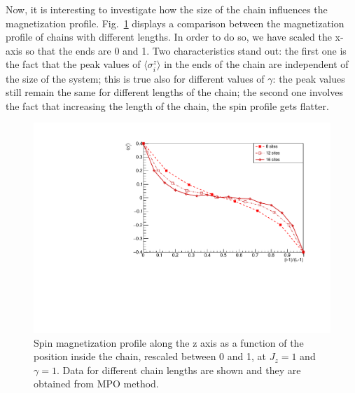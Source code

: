 
Now, it is interesting to investigate how the size of the chain influences the magnetization profile. Fig.~\ref{fig:LM_comparisonVSsizeJz1Gamma1} displays a comparison between the magnetization profile of chains with different lengths. In order to do so, we have scaled the x-axis so that the ends are 0 and 1. Two characteristics stand out: the first one is the fact that the peak values of $\langle\sigma_i^z\rangle$ in the ends of the chain are independent of the size of the system; this is true also for different values of $\gamma$: the peak values still remain the same for different lengths of the chain; the second one involves the fact that increasing the length of the chain, the spin profile gets flatter.

\begin{figure}[H]
    \centering
    \includegraphics[scale=0.7]{Figures/NORM_LM_comparisonVSsize.pdf}
    \captionsetup{width=1.\linewidth}
    \caption{Spin magnetization profile along the z axis as a function of the position inside the chain, rescaled between 0 and 1, at $J_z = 1$ and $\gamma=1$. Data for different chain lengths are shown and they are obtained from MPO method.}
    \label{fig:LM_comparisonVSsizeJz1Gamma1}
\end{figure}

